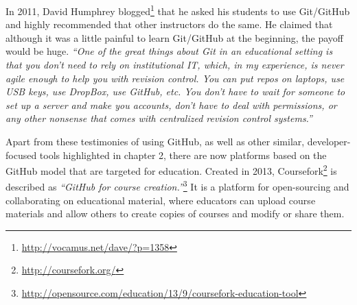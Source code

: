 In 2011, David Humphrey blogged\footnote{\url{http://vocamus.net/dave/?p=1358}} that he asked his students to use Git/GitHub and highly recommended that other instructors do the same. He claimed that although it was a little painful to learn Git/GitHub at the beginning, the payoff would be huge. \textit{``One of the great things about Git in an educational setting is that you don't need to rely on institutional IT, which, in my experience, is never agile enough to help you with revision control. You can put repos on laptops, use USB keys, use DropBox, use GitHub, etc. You don't have to wait for someone to set up a server and make you accounts, don't have to deal with permissions, or any other nonsense that comes with centralized revision control systems.''}


Apart from these testimonies of using GitHub, as well as other similar, developer-focused tools highlighted in chapter 2, there are now platforms based on the GitHub model that are targeted for education. Created in 2013, Coursefork\footnote{\url{http://coursefork.org/}} is described as \textit{``GitHub for course creation.''}\footnote{\url{http://opensource.com/education/13/9/coursefork-education-tool}} It is a platform for open-sourcing and collaborating on educational material, where educators can upload course materials and allow others to create copies of courses and modify or share them.


